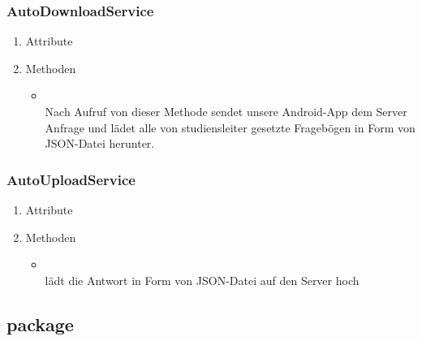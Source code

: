 \documentclass[a4paper]{scrreprt}
\begin{document}
{                \subsubsection{AutoDownloadService}
                    \begin{enumerate}
                        \item Attribute
                        \item Methoden
                            \begin{itemize}
                                \item {\large {}}\\
                                Nach Aufruf von dieser Methode sendet unsere Android-App dem Server Anfrage und lädet alle von studiensleiter gesetzte Fragebögen in Form von JSON-Datei herunter.
                            \end{itemize}
                    \end{enumerate}

                \subsubsection{AutoUploadService}
                    \begin{enumerate}
                        \item Attribute
                        \item Methoden
                            \begin{itemize}
                                \item {\large {}}\\
                                    lädt die Antwort in Form von JSON-Datei auf den Server hoch
                            \end{itemize}
                    \end{enumerate}

            \newpage
            \subsection{package }

}
\end{document}
